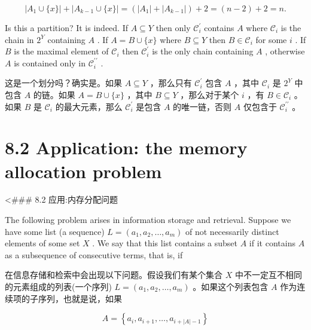 \documentclass[10pt]{article}
\begin{document}
\[
\left| {{A}_{1}\cup \{ x\} }\right|  + \left| {{A}_{k - 1}\cup \{ x\} }\right|  = \left( {\left| {A}_{1}\right|  + \left| {A}_{k - 1}\right| }\right)  + 2 = \left( {n - 2}\right)  + 2 = n.
\]

Is this a partition? It is indeed. If \(A \subseteq  Y\) then only \({\mathcal{C}}_{i}^{\prime }\) contains \(A\) where \({\mathcal{C}}_{i}\) is the chain in \({2}^{Y}\) containing \(A\) . If \(A = B \cup  \{ x\}\) where \(B \subseteq  Y\) then \(B \in  {\mathcal{C}}_{i}\) for some \(i\) . If \(B\) is the maximal element of \({\mathcal{C}}_{i}\) then \({\mathcal{C}}_{i}^{\prime }\) is the only chain containing \(A\) , otherwise \(A\) is contained only in \({\mathcal{C}}_{i}^{\prime \prime }\) .

\begin{tcolorbox}\relax
这是一个划分吗？确实是。如果 \(A \subseteq  Y\) ，那么只有 \({\mathcal{C}}_{i}^{\prime }\) 包含 \(A\) ，其中 \({\mathcal{C}}_{i}\) 是 \({2}^{Y}\) 中包含 \(A\) 的链。如果 \(A = B \cup  \{ x\}\) ，其中 \(B \subseteq  Y\) ，那么对于某个 \(i\) ，有 \(B \in  {\mathcal{C}}_{i}\) 。如果 \(B\) 是 \({\mathcal{C}}_{i}\) 的最大元素，那么 \({\mathcal{C}}_{i}^{\prime }\) 是包含 \(A\) 的唯一链，否则 \(A\) 仅包含于 \({\mathcal{C}}_{i}^{\prime \prime }\) 。
\end{tcolorbox}

\section*{8.2 Application: the memory allocation problem}

\begin{tcolorbox}\relax
<\#\#\# 8.2 应用:内存分配问题
\end{tcolorbox}

The following problem arises in information storage and retrieval. Suppose we have some list (a sequence) \(L = \left( {{a}_{1},{a}_{2},\ldots ,{a}_{m}}\right)\) of not necessarily distinct elements of some set \(X\) . We say that this list contains a subset \(A\) if it contains \(A\) as a subsequence of consecutive terms, that is, if

\begin{tcolorbox}\relax
在信息存储和检索中会出现以下问题。假设我们有某个集合 \(X\) 中不一定互不相同的元素组成的列表(一个序列) \(L = \left( {{a}_{1},{a}_{2},\ldots ,{a}_{m}}\right)\) 。如果这个列表包含 \(A\) 作为连续项的子序列，也就是说，如果
\end{tcolorbox}

\[
A = \left\{  {{a}_{i},{a}_{i + 1},\ldots ,{a}_{i + \left| A\right|  - 1}}\right\}
\]
\end{document}
